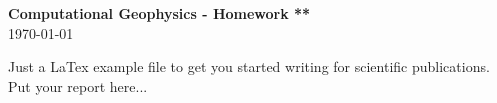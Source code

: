 \documentclass[11pt,titlepage,fleqn]{article}
\begin{document}
\begin{center}
\large {\bf Computational Geophysics - Homework **}\\
\today
\end{center}

\vspace{3cm}

Just a LaTex example file to get you started writing for scientific publications. \\

Put your report here...

%
\end{document}
